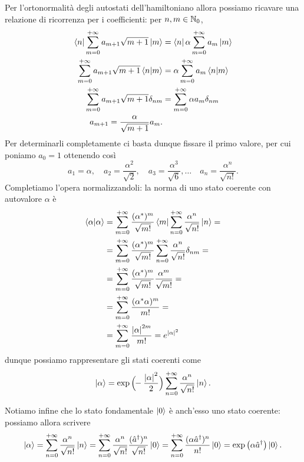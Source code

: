 Per l'ortonormalità degli autostati dell'hamiltoniano allora possiamo ricavare una relazione di ricorrenza per i coefficienti: per $n,m\in\mathbb{N}_0$,
\begin{equation}
	\begin{aligned}
		\left\langle{n}\right|\sum_{{m}=0}^{+\infty}a_{m+1}\sqrt{m+1}\left|{m}\right\rangle&=\left\langle{n}\right|\alpha\sum_{{m}=0}^{+\infty}a_m\left|{m}\right\rangle\\
		\sum_{{m}=0}^{+\infty}a_{m+1}\sqrt{m+1}\left\langle{n}\middle|{m}\right\rangle&=\alpha\sum_{{m}=0}^{+\infty}a_m\left\langle{n}\middle|{m}\right\rangle\\
		\sum_{{m}=0}^{+\infty}a_{m+1}\sqrt{m+1}\delta_{nm}&=\sum_{{m}=0}^{+\infty}\alpha a_m\delta_{nm}\\
		a_{m+1}=\frac{\alpha}{\sqrt{m+1}}a_m.
	\end{aligned}
	\label{eq:ricorrenza-stati-coerenti}
\end{equation}
Per determinarli completamente ci basta dunque fissare il primo valore, per cui poniamo $a_0=1$ ottenendo cos\`i
\begin{equation}
	a_1=\alpha,\quad a_2=\frac{\alpha^2}{\sqrt{2}},\quad a_3=\frac{\alpha^3}{\sqrt{6}},\dots\quad a_n=\frac{\alpha^n}{\sqrt{n!}}.
	\label{eq:coefficienti-stati-coerenti}
\end{equation}
Completiamo l'opera normalizzandoli: la norma di uno stato coerente con autovalore $\alpha$ è
\begin{equation}
	\begin{split}
		\left\langle{\alpha}\middle|{\alpha}\right\rangle&=\sum_{{m}=0}^{+\infty}\frac{(\alpha^*)^m}{\sqrt{m!}}\left\langle{m}\right|\sum_{{n}=0}^{+\infty}\frac{\alpha^n}{\sqrt{n!}}\left|{n}\right\rangle=\\
		&=\sum_{{m}=0}^{+\infty}\frac{(\alpha^*)^m}{\sqrt{m!}}\sum_{{n}=0}^{+\infty}\frac{\alpha^n}{\sqrt{n!}}\delta_{nm}=\\
		&=\sum_{{m}=0}^{+\infty}\frac{(\alpha^*)^m}{\sqrt{m!}}\frac{\alpha^m}{\sqrt{m!}}=\\
		&=\sum_{{m}=0}^{+\infty}\frac{(\alpha^*\alpha)^m}{m!}=\\
		&=\sum_{{m}=0}^{+\infty}\frac{\left|{\alpha}\right|^{2m}}{m!}=e^{\left|{\alpha}\right|^2}
	\end{split}
	\label{eq:norma-stato-coerente}
\end{equation}
dunque possiamo rappresentare gli stati coerenti come
\begin{equation}
	\left|{\alpha}\right\rangle=\exp\Big(\!\!-\frac{\left|{\alpha}\right|^2}2\Big)\sum_{{n}=0}^{+\infty}\frac{\alpha^n}{\sqrt{n!}}\left|{n}\right\rangle.
	\label{eq:stato-coerente-autostati-H}
\end{equation}

Notiamo infine che lo stato fondamentale $\left|{0}\right\rangle$ è anch'esso uno stato coerente: possiamo allora scrivere
\begin{equation}
	\left|{\alpha}\right\rangle=\sum_{{n}=0}^{+\infty}\frac{\alpha^n}{\sqrt{n!}}\left|{n}\right\rangle=\sum_{{n}=0}^{+\infty}\frac{\alpha^n}{\sqrt{n!}}\frac{({\hat{a}}^\dagger)^n}{\sqrt{n!}}\left|{0}\right\rangle=\sum_{{n}=0}^{+\infty}\frac{(\alpha{\hat{a}}^\dagger)^n}{n!}\left|{0}\right\rangle=\exp\big(\alpha{\hat{a}}^\dagger\big)\left|{0}\right\rangle.
	\label{eq:stato-coerente-exp}
\end{equation}

